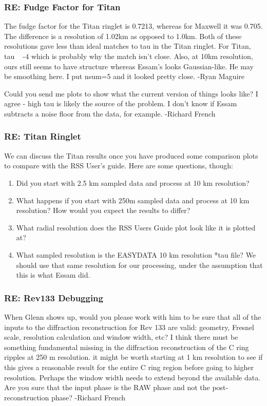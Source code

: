 \documentclass[crop=false,class=book]{standalone}
\begin{document}
\subsubsection{\footnotesize RE: Fudge Factor for Titan}
The fudge factor for the Titan ringlet is 0.7213, whereas for Maxwell it was 0.705. The difference is a resolution of 1.02km as opposed to 1.0km. Both of these resolutions gave less than ideal matches to tau in the Titan ringlet. For Titan, tau ~ -4 which is probably why the match isn't close.  Also, at 10km resolution, ours still seems to have structure whereas Essam's looks Gaussian-like. He may be smoothing here. I put nsum=5 and it looked pretty close. -Ryan Maguire\par
Could you send me plots to show what the current version of things looks like?
I agree - high tau is likely the source of the problem. I don't know if Essam subtracts a noise floor from the data, for example. -Richard French
\subsubsection{\footnotesize RE: Titan Ringlet}
We can discuss the Titan results once you have produced some comparison plots to compare with the RSS User's guide. Here are some questions, though:
\begin{enumerate}
    \item Did you start with 2.5 km sampled data and process at 10 km resolution?
    \item What happens if you start with 250m sampled data and process at 10 km resolution? How would you expect the results to differ?
    \item What radial resolution does the RSS Users Guide plot look like it is plotted at?
    \item What sampled resolution is the EASYDATA 10 km resolution *tau file? We should use that same resolution for our processing, under the assumption that this is what Essam did.
\end{enumerate}
\subsubsection{\footnotesize RE: Rev133 Debugging}
When Glenn shows up, would you please work with him to be sure that all of the inputs to the diffraction reconstruction for Rev 133 are valid: geometry, Fresnel scale, resolution calculation and window width, etc? I think there must be something fundamental missing in the diffraction reconstruction of the C ring ripples  at 250 m resolution. it might be worth starting at 1 km resolution to see if this gives a reasonable result for the entire C ring region before going to higher resolution. Perhaps the window width needs to extend beyond the available data. Are you sure that the input phase is the RAW phase and not the post-reconstruction phase? -Richard French
\end{document}
